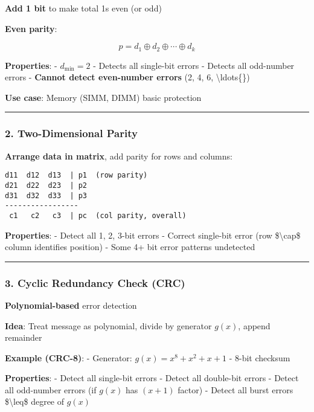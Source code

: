 \textbf{Add 1 bit} to make total 1\textquotesingle s even (or odd)

\textbf{Even parity}:

\[
p = d_1 \oplus d_2 \oplus \cdots \oplus d_k
\]

\textbf{Properties}: - \(d_{\min} = 2\) - Detects all single-bit errors
- Detects all odd-number errors - \textbf{Cannot detect even-number
errors} (2, 4, 6, \textbackslash ldots\{\})

\textbf{Use case}: Memory (SIMM, DIMM) basic protection

\begin{center}\rule{0.5\linewidth}{0.5pt}\end{center}

\subsubsection{2. Two-Dimensional Parity}\label{two-dimensional-parity}

\textbf{Arrange data in matrix}, add parity for rows and columns:

\begin{verbatim}
d11  d12  d13  | p1  (row parity)
d21  d22  d23  | p2
d31  d32  d33  | p3
-----------------
 c1   c2   c3  | pc  (col parity, overall)
\end{verbatim}

\textbf{Properties}: - Detect all 1, 2, 3-bit errors - Correct
single-bit error (row \$\textbackslash cap\$ column identifies position)
- Some 4+ bit error patterns undetected

\begin{center}\rule{0.5\linewidth}{0.5pt}\end{center}

\subsubsection{3. Cyclic Redundancy Check
(CRC)}\label{cyclic-redundancy-check-crc}

\textbf{Polynomial-based} error detection

\textbf{Idea}: Treat message as polynomial, divide by generator
\(g(x)\), append remainder

\textbf{Example (CRC-8)}: - Generator: \(g(x) = x^8 + x^2 + x + 1\) -
8-bit checksum

\textbf{Properties}: - Detect all single-bit errors - Detect all
double-bit errors - Detect all odd-number errors (if \(g(x)\) has
\((x+1)\) factor) - Detect all burst errors \$\textbackslash leq\$
degree of \(g(x)\)

